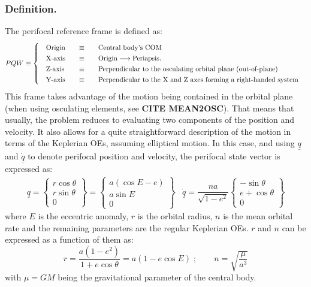 		\subsubsection{Definition.}
		\indent The perifocal reference frame is defined as:
		\[
		\arraycolsep=10pt
		\def\arraystretch{1.3}
		PQW\equiv\left\{
		\begin{array}{lll}
		\text{Origin} 	& \equiv 	& \text{Central body's COM} \\
		\text{X-axis} 	& \equiv 	& \text{Origin} \longrightarrow \text{Periapsis.} \\
		\text{Z-axis} 	& \equiv 	& \text{Perpendicular to the osculating orbital plane (out-of-plane)} \\
		\text{Y-axis} 	& \equiv 	& \text{Perpendicular to the X and Z axes forming a right-handed system} \\
		\end{array}
		\right.
		\]
		\indent This frame takes advantage of the motion being contained in the orbital plane (when using osculating elements, see \textbf{CITE MEAN2OSC}). That means that usually, the problem reduces to evaluating two components of the position and velocity. It also allows for a quite straightforward description of the motion in terms of the Keplerian OEs, assuming elliptical motion. In this case, and using $\underline{q}$ and $\underline{\dot{q}}$ to denote perifocal position and velocity, the perifocal state vector is expressed as:
		\[\begin{array}{cc}
		\underline{q} = \left\{ 
		\begin{array}{c}
		r \cos \theta \\
		r \sin \theta \\
		0
		\end{array}				
		\right\} = 
		\left\{ 
		\begin{array}{c}
		a \left( \cos E - e \right) \\
		a \sin E\\
		0
		\end{array}				
		\right\} 		&
		\underline{\dot{q}} = \dfrac{na}{\sqrt{1-e^2}}
		\left\{ 
		\begin{array}{c}
		-\sin\theta\\
		e + \cos \theta\\
		0
		\end{array}				
		\right\}		
		\end{array}
		\]
		\noindent where $E$ is the eccentric anomaly, $r$ is the orbital radius, $n$ is the mean orbital rate and the remaining parameters are the regular Keplerian OEs. $r$ and $n$ can be expressed as a function of them as:
		\[
		r = \dfrac{a (1 - e^2)}{1 + e \cos\theta} = a (1 - e\cos E) \; ; \qquad n = \sqrt{\dfrac{\mu }{a^3}}		
		\]
		\noindent with $\mu = GM$ being the gravitational parameter of the central body.
